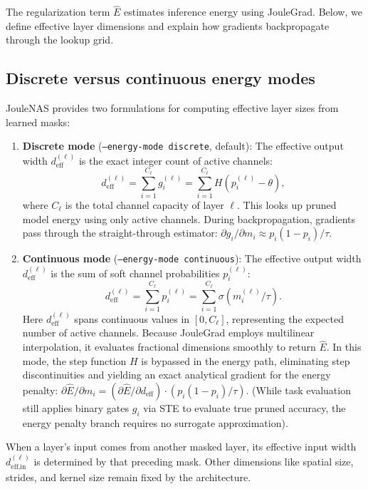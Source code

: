 The regularization term $\widehat{E}$ estimates inference energy using JouleGrad. Below, we define effective layer dimensions and explain how gradients backpropagate through the lookup grid.

\subsection{Discrete versus continuous energy modes}
\label{subsec:energy_mode}
JouleNAS provides two formulations for computing effective layer sizes from learned masks:

\begin{enumerate}
    \item \textbf{Discrete mode} (\texttt{--energy-mode discrete}, default):
    The effective output width $d^{(\ell)}_{\text{eff}}$ is the exact integer count of active channels:
    $$
    d^{(\ell)}_{\text{eff}} = \sum_{i=1}^{C_\ell} g^{(\ell)}_i = \sum_{i=1}^{C_\ell} H(p^{(\ell)}_i - \theta),
    $$
    where $C_\ell$ is the total channel capacity of layer $\ell$.
    This looks up pruned model energy using only active channels.
    During backpropagation, gradients pass through the straight-through estimator: $\partial g_i / \partial m_i \approx p_i (1 - p_i) / \tau$.

    \item \textbf{Continuous mode} (\texttt{--energy-mode continuous}):
    The effective output width $d^{(\ell)}_{\text{eff}}$ is the sum of soft channel probabilities $p^{(\ell)}_i$:
    $$
    d^{(\ell)}_{\text{eff}} = \sum_{i=1}^{C_\ell} p^{(\ell)}_i = \sum_{i=1}^{C_\ell} \sigma(m^{(\ell)}_i / \tau).
    $$
    Here $d^{(\ell)}_{\text{eff}}$ spans continuous values in $[0, C_\ell]$, representing the expected number of active channels.
    Because JouleGrad employs multilinear interpolation, it evaluates fractional dimensions smoothly to return $\widehat{E}$.
    In this mode, the step function $H$ is bypassed in the energy path, eliminating step discontinuities and yielding an exact analytical gradient for the energy penalty:
    $\partial \widehat{E} / \partial m_i = (\partial \widehat{E} / \partial d_{\text{eff}}) \cdot (p_i (1 - p_i) / \tau)$.
    (While task evaluation still applies binary gates $g_i$ via STE to evaluate true pruned accuracy, the energy penalty branch requires no surrogate approximation).
\end{enumerate}

When a layer's input comes from another masked layer, its effective input width $d^{(\ell)}_{\text{eff,in}}$ is determined by that preceding mask. Other dimensions like spatial size, strides, and kernel size remain fixed by the architecture.

